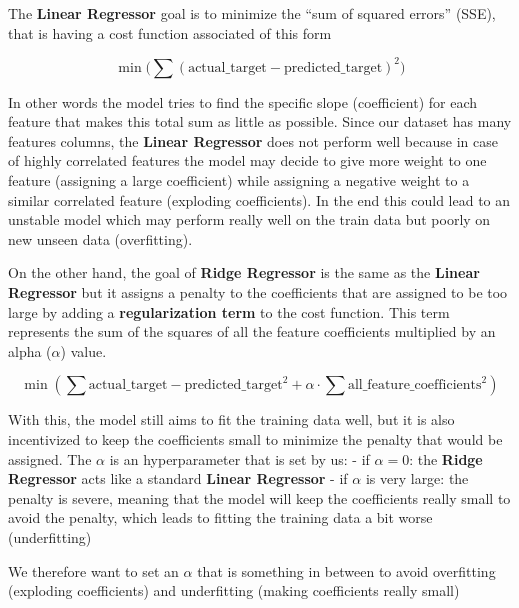 \documentclass[11pt]{article}
\begin{document}
The \textbf{Linear Regressor} goal is to minimize the ``sum of squared
errors'' (SSE), that is having a cost function associated of this form

\[\min(\sum{(\mathrm{actual\_target} - \mathrm{predicted\_target})^2)}\]

In other words the model tries to find the specific slope (coefficient)
for each feature that makes this total sum as little as possible. Since
our dataset has many features columns, the \textbf{Linear Regressor}
does not perform well because in case of highly correlated features the
model may decide to give more weight to one feature (assigning a large
coefficient) while assigning a negative weight to a similar correlated
feature (exploding coefficients). In the end this could lead to an
unstable model which may perform really well on the train data but
poorly on new unseen data (overfitting).

On the other hand, the goal of \textbf{Ridge Regressor} is the same as
the \textbf{Linear Regressor} but it assigns a penalty to the
coefficients that are assigned to be too large by adding a
\textbf{regularization term} to the cost function. This term represents
the sum of the squares of all the feature coefficients multiplied by an
alpha (\(\alpha\)) value.

\[\min(\sum\mathrm{actual\_target} - \mathrm{predicted\_target}^2 + \alpha\cdot\sum{\mathrm{all\_feature\_coefficients}^2})\]

With this, the model still aims to fit the training data well, but it is
also incentivized to keep the coefficients small to minimize the penalty
that would be assigned. The \(\alpha\) is an hyperparameter that is set
by us: - if \(\alpha = 0\): the \textbf{Ridge Regressor} acts like a
standard \textbf{Linear Regressor} - if \(\alpha\) is very large: the
penalty is severe, meaning that the model will keep the coefficients
really small to avoid the penalty, which leads to fitting the training
data a bit worse (underfitting)

We therefore want to set an \(\alpha\) that is something in between to
avoid overfitting (exploding coefficients) and underfitting (making
coefficients really small)
\end{document}

